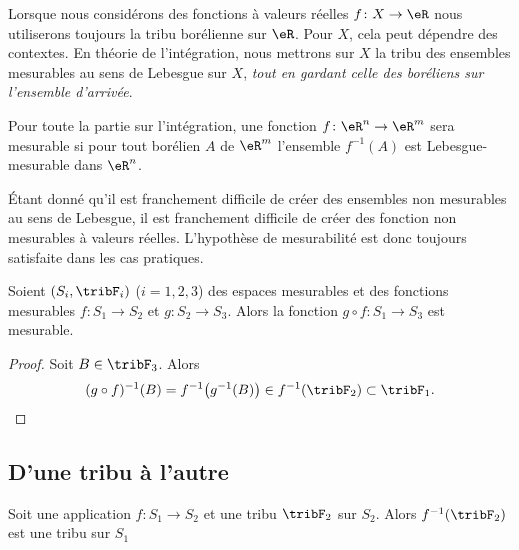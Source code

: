 \begin{remark}
    Lorsque nous considérons des fonctions à valeurs réelles \( f\colon X\to \eR\) nous utiliserons toujours la tribu borélienne sur \( \eR\). Pour \( X\), cela peut dépendre des contextes. En théorie de l'intégration, nous mettrons sur \( X\) la tribu des ensembles mesurables au sens de Lebesgue sur \( X\), \emph{tout en gardant celle des boréliens sur l'ensemble d'arrivée}.

    Pour toute la partie sur l'intégration, une fonction \( f\colon \eR^n\to \eR^m\) sera mesurable si pour tout borélien \( A\) de \( \eR^m\) l'ensemble \( f^{-1}(A)\) est Lebesgue-mesurable dans \( \eR^n\).

    Étant donné qu'il est franchement difficile de créer des ensembles non mesurables au sens de Lebesgue, il est franchement difficile de créer des fonction non mesurables à valeurs réelles. L'hypothèse de mesurabilité est donc toujours satisfaite dans les cas pratiques.
\end{remark}

\begin{proposition}     \label{PROPooEFHKooARJBwW}
    Soient \( (S_i,\tribF_i)\) (\( i=1,2,3\)) des espaces mesurables et des fonctions mesurables \( f\colon S_1\to S_2\) et \( g\colon S_2\to S_3\). Alors la fonction \( g\circ f\colon S_1\to S_3\) est mesurable.
\end{proposition}

\begin{proof}
    Soit \( B\in\tribF_3\). Alors
    \begin{equation}
        (g\circ f)^{-1}(B)=f^{-1}\big( g^{-1}(B) \big)\in f^{-1}(\tribF_2)\subset\tribF_1.
    \end{equation}
\end{proof}

\subsection{D'une tribu à l'autre}


\begin{lemma}       \label{LemooVDXJooZNYelH}
    Soit une application \( f\colon S_1\to S_2\) et une tribu \( \tribF_2\) sur \( S_2\). Alors \( f^{-1}(\tribF_2)\) est une tribu sur \( S_1\)
\end{lemma}

